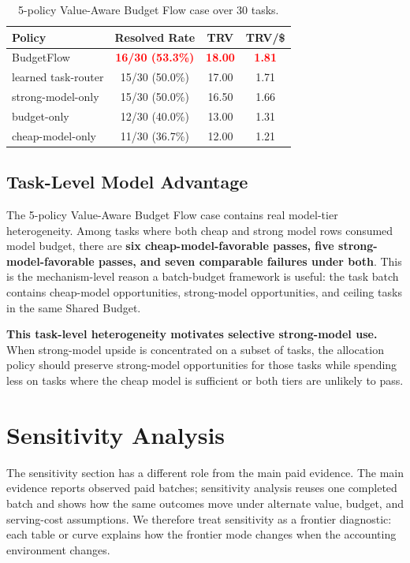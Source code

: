 \documentclass{article}
\newcommand{\method}{BudgetFlow\xspace}
\newcommand{\sharedbudget}{Shared Budget\xspace}
\newcommand{\pos}[1]{\textcolor{red}{\textbf{#1}}}
\begin{document}
\begin{table}[t]
\centering
\small
\begin{tabular}{lccc}
\toprule
Policy & Resolved Rate & TRV & TRV/\$ \\
\midrule
\method & \pos{16/30 (53.3\%)} & \pos{18.00} & \pos{1.81} \\
learned task-router & 15/30 (50.0\%) & 17.00 & 1.71 \\
strong-model-only & 15/30 (50.0\%) & 16.50 & 1.66 \\
budget-only & 12/30 (40.0\%) & 13.00 & 1.31 \\
cheap-model-only & 11/30 (36.7\%) & 12.00 & 1.21 \\
\bottomrule
\end{tabular}
\caption{5-policy Value-Aware Budget Flow case over 30 tasks.}
\label{tab:full-vabf-case}
\end{table}

\subsection{Task-Level Model Advantage}
The 5-policy Value-Aware Budget Flow case contains real model-tier heterogeneity. Among tasks where both cheap and strong model rows consumed model budget, there are \textbf{six cheap-model-favorable passes, five strong-model-favorable passes, and seven comparable failures under both}. This is the mechanism-level reason a batch-budget framework is useful: the task batch contains cheap-model opportunities, strong-model opportunities, and ceiling tasks in the same \sharedbudget.

\textbf{This task-level heterogeneity motivates selective strong-model use.} When strong-model upside is concentrated on a subset of tasks, the allocation policy should preserve strong-model opportunities for those tasks while spending less on tasks where the cheap model is sufficient or both tiers are unlikely to pass.

\section{Sensitivity Analysis}
\label{sec:sensitivity}
The sensitivity section has a different role from the main paid evidence. The main evidence reports observed paid batches; sensitivity analysis reuses one completed batch and shows how the same outcomes move under alternate value, budget, and serving-cost assumptions. We therefore treat sensitivity as a frontier diagnostic: each table or curve explains how the frontier mode changes when the accounting environment changes.
\end{document}
